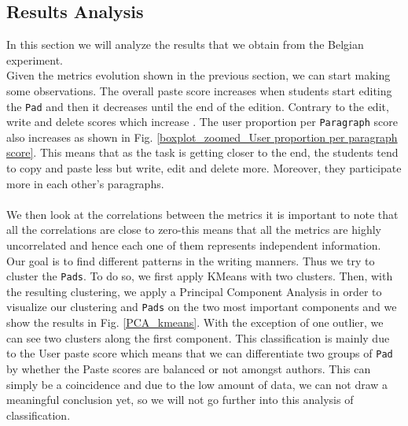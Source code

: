 \documentclass[a4, twocolumn, 12pt]{article}
\begin{document}
\subsection{Results Analysis}
In this section we will analyze the results that we obtain from the Belgian experiment. \\
Given the metrics evolution shown in the previous section, we can start making some observations. The overall paste score increases when students start editing the \texttt{Pad} and then it decreases until the end of the edition. Contrary to the edit, write and delete scores which increase . The user proportion per \texttt{Paragraph} score also increases as shown in Fig. \ref{boxplot_zoomed_User proportion per paragraph score}. This means that as the task is getting closer to the end, the students tend to copy and paste less but write, edit and delete more. Moreover, they participate more in each other’s paragraphs.\\
\\
We then look at the correlations between the metrics it is important  to note that all the correlations are close to zero-this means that all the metrics are highly uncorrelated and hence each one of them represents independent information. Our goal is to find different patterns in the writing manners. Thus  we try to cluster the \texttt{Pads}. To do so, we first apply KMeans with two clusters. Then, with  the resulting clustering, we apply a Principal Component Analysis in order to visualize our clustering and \texttt{Pads} on the two most important components and we show the results in Fig. \ref{PCA_kmeans}. With the exception of one outlier, we can see two clusters along the first component. This classification is mainly due to the User paste score which means that we can differentiate two groups of \texttt{Pad} by whether the Paste scores are  balanced or not amongst authors. This can simply be a coincidence and due to the low amount of data, we can not draw a meaningful conclusion yet, so we will not go further into this analysis of classification.
\end{document}
